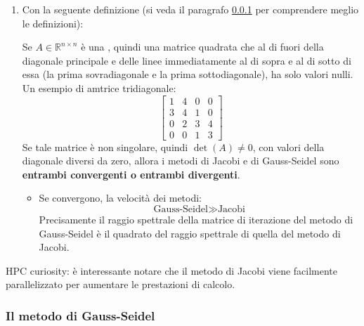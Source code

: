 \begin{enumerate}
    \item Con la seguente definizione (si veda il paragrafo \ref{subsubsection: il metodo di Gauss-Seidel} per comprendere meglio le definizioni):
    \begin{definitionbox}\label{definizione: convergenza di Jacobi e Gauss-Seidel}
        Se $A \in \mathbb{R}^{n \times n}$ è una , quindi una matrice quadrata che al di fuori della diagonale principale e delle linee immediatamente al di sopra e al di sotto di essa (la prima sovradiagonale e la prima sottodiagonale), ha solo valori nulli. Un esempio di amtrice tridiagonale:
        \begin{equation*}
            \begin{bmatrix}
                1 & 4 & 0 & 0 \\
                3 & 4 & 1 & 0 \\
                0 & 2 & 3 & 4 \\
                0 & 0 & 1 & 3
            \end{bmatrix}
        \end{equation*}
        Se tale matrice è non singolare, quindi $\det\left(A\right) \ne 0$, con valori della diagonale diversi da zero, allora i metodi di Jacobi e di Gauss-Seidel sono \textbf{entrambi convergenti o entrambi divergenti}.
        \begin{itemize}
            \item Se convergono, la velocità dei metodi:
            \begin{equation*}
                \text{Gauss-Seidel} \gg \text{Jacobi}
            \end{equation*}
            Precisamente il raggio spettrale della matrice di iterazione del metodo di Gauss-Seidel è il quadrato del raggio spettrale di quella del metodo di Jacobi.
        \end{itemize}
    \end{definitionbox}
\end{enumerate}

\highspace
HPC curiosity: è interessante notare che il metodo di Jacobi viene facilmente parallelizzato per aumentare le prestazioni di calcolo.

\newpage

\subsubsection{Il metodo di Gauss-Seidel}\label{subsubsection: il metodo di Gauss-Seidel}

